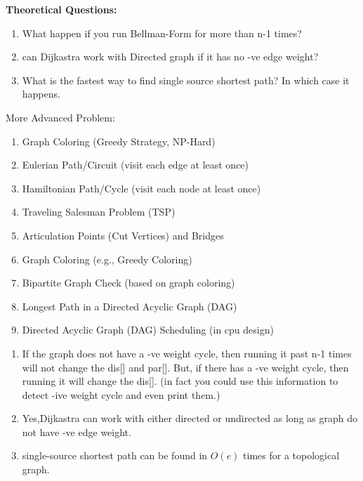 \begin{exercise}
    \textbf{Theoretical Questions:}
    \begin{enumerate}
        \item What happen if you run Bellman-Form for more than n-1 times?
        \item can Dijkastra work with Directed graph if it has no -ve edge weight?
        \item What is the fastest way to find single source shortest path? In which case it happens.
    \end{enumerate}

    More Advanced Problem:
    \begin{enumerate}
        \item Graph Coloring (Greedy Strategy, NP-Hard)
        \item Eulerian Path/Circuit (visit each edge at least once)
        \item Hamiltonian Path/Cycle (visit each node at least once)
        \item Traveling Salesman Problem (TSP)
        \item Articulation Points (Cut Vertices) and Bridges
        \item Graph Coloring (e.g., Greedy Coloring)
        \item Bipartite Graph Check (based on graph coloring)
        \item Longest Path in a Directed Acyclic Graph (DAG)
        \item Directed Acyclic Graph (DAG) Scheduling (in cpu design)
    \end{enumerate}
\end{exercise}

\begin{exerciseHints}
    \begin{enumerate}
      
    \item If the graph does not have a -ve weight cycle, then running it past n-1 times will not change the dis[] and par[].
    But, if there has a -ve weight cycle, then running it will change the dis[]. (in fact you could use this information to detect -ive weight cycle and even print them.)

    \item Yes,Dijkastra can work with either directed or undirected as long as graph do not have -ve edge weight.
    \item single-source shortest path can be found in $O(e)$ times for a topological graph.
    \end{enumerate}
\end{exerciseHints}